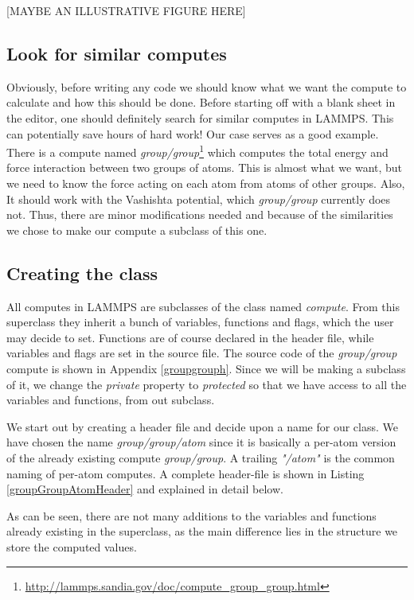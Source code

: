 \documentclass[twoside,english]{uiofysmaster}
\begin{document}
{\color{editColor}[MAYBE AN ILLUSTRATIVE FIGURE HERE]}

\subsection{Look for similar computes}
Obviously, before writing any code we should know what we want the compute to calculate and how this should be done. 
Before starting off with a blank sheet in the editor, one should definitely search for similar computes in LAMMPS. This can potentially save hours of hard work!
Our case serves as a good example.
There is a compute named \textit{group/group}\footnote{\href{http://lammps.sandia.gov/doc/compute_group_group.html}{http://lammps.sandia.gov/doc/compute\_group\_group.html}} which computes the total energy and force interaction between two groups of atoms. 
This is almost what we want, but we need to know the force acting on each atom from atoms of other groups. 
Also, It should work with the Vashishta potential, which \textit{group/group} currently does not.
Thus, there are minor modifications needed and because of the similarities we chose to make our compute a subclass of this one.


\subsection{Creating the class}
All computes in LAMMPS are subclasses of the class named  \textit{compute}. 
From this superclass they inherit a bunch of variables, functions and flags, which the user may decide to set. 
Functions are of course declared in the header file, while variables and flags are set in the source file. 
The source code of the \textit{group/group} compute is shown in Appendix \ref{groupgrouph}. 
Since we will be making a subclass of it, we change the \textit{private} property to \textit{protected} so that we have access to all the variables and functions, from out subclass.

We start out by creating a header file and decide upon a name for our class. 
We have chosen the name \textit{group/group/atom} since it is basically a per-atom version of the already existing compute \textit{group/group}. 
A trailing {\it "/atom"} is the common naming of per-atom computes. 
A complete header-file is shown in Listing \ref{groupGroupAtomHeader} and explained in detail below.


As can be seen, there are not many additions to the variables and functions already existing in the superclass, as the main difference lies in the structure we store the computed values.
\end{document}
